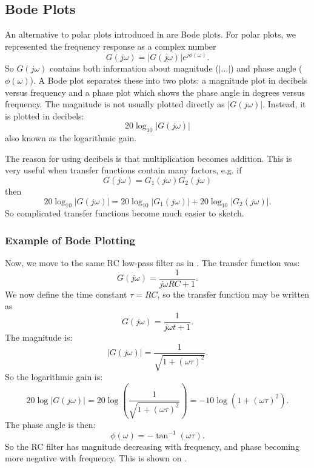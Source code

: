 \subsection{Bode Plots}
An alternative to polar plots introduced in  are Bode plots.
For polar plots, we represented the frequency response as a complex number
\begin{equation*}
  G(j\omega) = \left| G(j\omega) \right|e^{j\phi(\omega)}
.\end{equation*}
So $G(j\omega)$ contains both information about magnitude ($\left| \ldots  \right|$) and phase angle ($\phi(\omega)$).
A Bode plot separates these into two plots: a magnitude plot in decibels versus frequency and a phase plot which shows the phase angle in degrees versus frequency.
The magnitude is not usually plotted directly as $\left| G(j\omega) \right|$.
Instead, it is plotted in decibels:
\begin{equation*}
  20 \log_{10} \left| G(j\omega) \right|
\end{equation*}
also known as the logarithmic gain.

The reason for using decibels is that multiplication becomes addition.
This is very useful when transfer functions contain many factors, e.g. if
\begin{equation*}
  G(j\omega) = G_1(j\omega) G_2(j\omega)
\end{equation*}
then
\begin{equation*}
  20 \log_{10} \left| G(j\omega) \right| = 20 \log_{10} \left| G_1 (j\omega) \right| + 20 \log_{10} \left| G_2 (j\omega) \right|
.\end{equation*}
So complicated transfer functions become much easier to sketch.

\subsubsection{Example of Bode Plotting}
Now, we move to the same RC low-pass filter as in .
The transfer function was:
\begin{equation*}
  G(j\omega) = \frac{1}{j\omega RC + 1}
.\end{equation*}
We now define the time constant $\tau = RC$, so the transfer function may be written as
\begin{equation*}
  G(j\omega) = \frac{1}{j\omega t + 1}
.\end{equation*}
The magnitude is:
\begin{equation*}
  \left| G(j\omega) \right| = \frac{1}{\sqrt{1 + \left( \omega \tau \right)^2}}
.\end{equation*}
So the logarithmic gain is:
\begin{equation*}
  20 \log \left| G(j\omega) \right| = 20 \log \left( \frac{1}{\sqrt{1 + \left( \omega \tau \right)^2}} \right) = - 10 \log \left( 1 + \left( \omega \tau \right)^2 \right)
.\end{equation*}
The phase angle is then:
\begin{equation*}
  \phi(\omega) = - \tan^{-1} (\omega\tau)
.\end{equation*}
So the RC filter has magnitude decreasing with frequency, and phase becoming more negative with frequency.
This is shown on .

